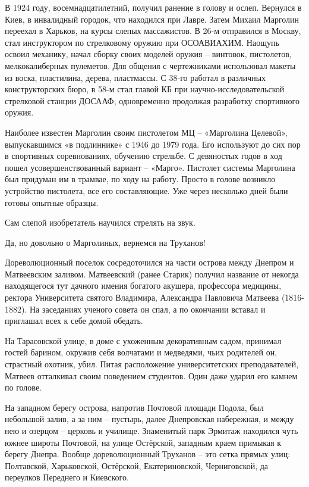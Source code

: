 В 1924 году, восемнадцатилетний, получил ранение в голову и ослеп. Вернулся в Киев, в инвалидный городок, что находился при Лавре. Затем Михаил Марголин переехал в Харьков, на курсы слепых массажистов. В 26-м отправился в Москву, стал инструктором по стрелковому оружию при ОСОАВИАХИМ. Наощупь освоил механику, начал сборку своих моделей оружия – винтовок, пистолетов, мелкокалиберных пулеметов. Для общения с чертежниками использовал макеты из воска, пластилина, дерева, пластмассы. С 38-го работал в различных конструкторских бюро, в 58-м стал главой КБ при научно-исследовательской стрелковой станции ДОСААФ, одновременно продолжая разработку спортивного оружия.

Наиболее известен Марголин своим пистолетом МЦ – «Марголина Целевой», выпускавшимся «в подлиннике» с 1946 до 1979 года. Его используют до сих пор в спортивных соревнованиях, обучению стрельбе. С девяностых годов в ход пошел усовершенствованный вариант – «Марго». Пистолет системы Марголина был придуман им в трамвае, по ходу на работу. Просто в голове возникло устройство пистолета, все его составляющие. Уже через несколько дней были готовы опытные образцы.

Сам слепой изобретатель научился стрелять на звук.

Да, но довольно о Марголиных, вернемся на Труханов!

Дореволюционный поселок сосредоточился на части острова между Днепром и Матвеевским заливом. Матвеевский (ранее Старик) получил название от некогда находящегося тут дачного имения богатого акушера, профессора медицины, ректора Университета святого Владимира, Александра Павловича Матвеева (1816-1882). На заседаниях ученого совета он спал, а по окончании вставал и приглашал всех к себе домой обедать.

На Тарасовской улице, в доме с ухоженным декоративным садом, принимал гостей барином, окружив себя волчатами и медведями, чьих родителей он, страстный охотник, убил. Питая расположение университетских преподавателей, Матвеев отталкивал своим поведением студентов. Один даже ударил его камнем по голове.

На западном берегу острова, напротив Почтовой площади Подола, был небольшой залив, а за ним – пустырь, далее Днепровская набережная, и между нею и озерцом – церковь и училище. Знаменитый парк Эрмитаж находился чуть южнее широты Почтовой, на улице Остёрской, западным краем примыкая к берегу Днепра. Вообще дореволюционный Труханов – это сетка прямых улиц: Полтавской, Харьковской, Остёрской, Екатериновской, Черниговской, да переулков Переднего и Киевского. 

